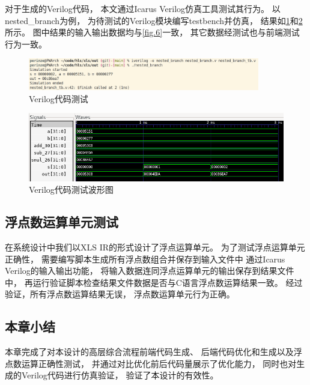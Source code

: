 对于生成的Verilog代码，
本文通过Icarus Verilog仿真工具测试其行为。
以nested\_branch为例，
为待测试的Verilog模块编写testbench并仿真，
结果如\ref{fig.12}和\ref{fig.13}所示。
图中结果的输入输出数据均与\ref{fig.6}一致，
其它数据经测试也与前端测试行为一致。

\begin{figure}[h]
\centering
\includegraphics[width=0.9\textwidth]{figure/verilog_test.png}
\caption{Verilog代码测试}
\label{fig.12}
\end{figure}

\begin{figure}[h]
\centering
\includegraphics{figure/wave.png}
\caption{Verilog代码测试波形图}
\label{fig.13}
\end{figure}

\pagebreak

\subsection{浮点数运算单元测试}

在系统设计中我们以XLS IR的形式设计了浮点运算单元。
为了测试浮点运算单元正确性，
需要编写脚本生成所有浮点数组合并保存到输入文件中
通过Icarus Verilog的输入输出功能，
将输入数据连同浮点运算单元的输出保存到结果文件中，
再运行验证脚本检查结果文件数据是否与C语言浮点数运算结果一致。
经过验证，所有浮点数运算结果无误，
浮点数运算单元行为正确。

\subsection{本章小结}

本章完成了对本设计的高层综合流程前端代码生成、
后端代码优化和生成以及浮点数运算正确性测试，
并通过对比优化前后代码量展示了优化能力，
同时也对生成的Verilog代码进行仿真验证，
验证了本设计的有效性。